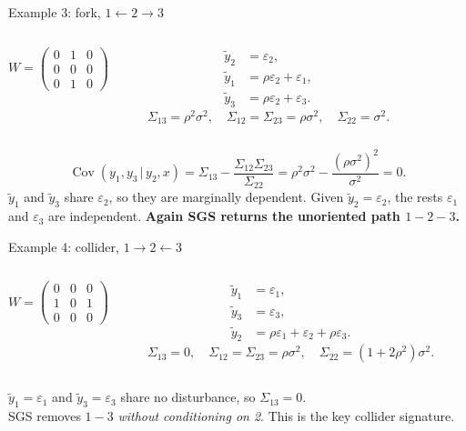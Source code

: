 \documentclass[aspectratio=169,11pt]{beamer}
\newcommand{\Cov}{\operatorname{Cov}}
\newcommand{\given}{\,\vert\,}
\newcommand{\yt}{\widetilde y}
\newcommand{\good}[1]{\textcolor{Petrol}{\bfseries #1}}
\begin{document}
\begin{frame}{Example 3: fork, $1\leftarrow2\to3$}
\begin{columns}[T,totalwidth=\linewidth]
\[W=\begin{pmatrix}0&1&0\\0&0&0\\0&1&0\end{pmatrix}\]
\begin{center}\end{center}
\[
\begin{aligned}
\yt_2&=\varepsilon_2,\\
\yt_1&=\rho\varepsilon_2+\varepsilon_1,\\
\yt_3&=\rho\varepsilon_2+\varepsilon_3.
\end{aligned}
\]
\[
\Sigma_{13}=\rho^2\sigma^2,\quad\Sigma_{12}=\Sigma_{23}=\rho\sigma^2,\quad\Sigma_{22}=\sigma^2.
\]
\end{columns}
\[
\Cov(y_1,y_3\given y_2,x)=\Sigma_{13}-\frac{\Sigma_{12}\Sigma_{23}}{\Sigma_{22}}=\rho^2\sigma^2-\frac{(\rho\sigma^2)^2}{\sigma^2}=0.
\]
$\yt_1$ and $\yt_3$ share $\varepsilon_2$, so they are marginally dependent. Given $\yt_2=\varepsilon_2$, the rests $\varepsilon_1$ and $\varepsilon_3$ are independent. \good{Again SGS returns the unoriented path $1-2-3$.}
\end{frame}

\begin{frame}{Example 4: collider, $1\to2\leftarrow3$}
\begin{columns}[T,totalwidth=\linewidth]
\[W=\begin{pmatrix}0&0&0\\1&0&1\\0&0&0\end{pmatrix}\]
\begin{center}\end{center}
\[
\begin{aligned}
\yt_1&=\varepsilon_1,\\
\yt_3&=\varepsilon_3,\\
\yt_2&=\rho\varepsilon_1+\varepsilon_2+\rho\varepsilon_3.
\end{aligned}
\]
\[
\Sigma_{13}=0,\quad\Sigma_{12}=\Sigma_{23}=\rho\sigma^2,
\quad\Sigma_{22}=(1+2\rho^2)\sigma^2.
\]
\end{columns}
\vspace{2mm}
$\yt_1=\varepsilon_1$ and $\yt_3=\varepsilon_3$ share no disturbance, so $\Sigma_{13}=0$.\\[1mm]
SGS removes $1-3$ \emph{without conditioning on 2}. This is the key collider signature.
\end{frame}
\end{document}
